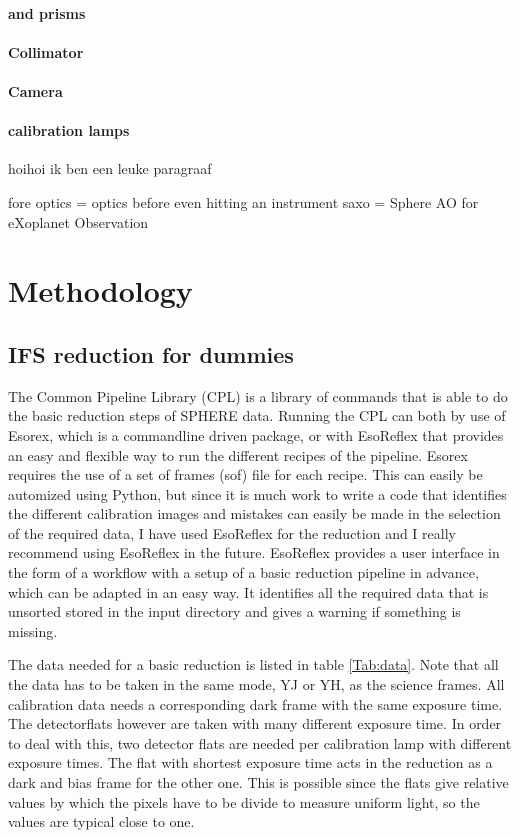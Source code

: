 \documentclass[twoside,single]{lion-msc}
\begin{document}
\subsubsection{and prisms}
\subsubsection{Collimator}
\subsubsection{Camera}
\subsubsection{calibration lamps} 
hoihoi ik ben een leuke paragraaf

fore optics = optics before even hitting an instrument
saxo = Sphere AO for eXoplanet Observation

\chapter{Methodology}

\section{IFS reduction for dummies}
The Common Pipeline Library (CPL)\citep{Observatory2007} is a library of commands that is able to do the basic reduction steps of SPHERE data. Running the CPL can both by use of Esorex, which is a commandline driven package, or with EsoReflex that provides an easy and flexible way to run the different recipes of the pipeline. Esorex requires the use of a set of frames (sof) file for each recipe. This can easily be automized using Python, but since it is much work to write a code that identifies the different calibration images and mistakes can easily be made in the selection of the required data, I have used EsoReflex for the reduction and I really recommend using EsoReflex in the future. EsoReflex provides a user interface in the form of a workflow with a setup of a basic reduction pipeline in advance, which can be adapted in an easy way. It identifies all the required data that is unsorted stored in the input directory and gives a warning if something is missing. 
\bigskip

The data needed for a basic reduction is listed in table \ref{Tab:data}. Note that all the data has to be taken in the same mode, YJ or YH, as the science frames. All calibration data needs a corresponding dark frame with the same exposure time. The detectorflats however are taken with many different exposure time. In order to deal with this, two detector flats are needed per calibration lamp with different exposure times. The flat with shortest exposure time acts in the reduction as a dark and bias frame for the other one. This is possible since the flats give relative values by which the pixels have to be divide to measure uniform light, so the values are typical close to one. 
\bigskip
\end{document}
